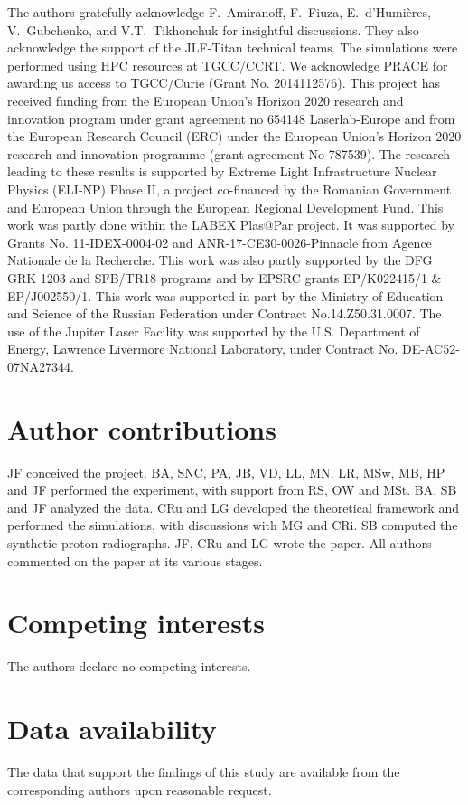 \documentclass[aps,showpacs,superscriptaddress]{revtex4}
\begin{document}
\begin{acknowledgments}
The authors gratefully acknowledge F.~Amiranoff, F.~Fiuza, E.~d'Humi\`eres, V.~Gubchenko, and V.T.~Tikhonchuk for insightful discussions.
They also acknowledge the support of the JLF-Titan technical teams.
The simulations were performed using HPC resources at TGCC/CCRT. We acknowledge PRACE for awarding us access to TGCC/Curie (Grant No. 2014112576).
This project has received funding from the European Union’s Horizon 2020 research and innovation program under grant agreement no 654148 Laserlab-Europe and from the European Research Council (ERC) under the European Union’s Horizon 2020 research and innovation programme (grant agreement No 787539).
The research leading to these results is supported by Extreme Light Infrastructure Nuclear Physics (ELI-NP) Phase II, a project co-financed by the Romanian Government and European Union through the European Regional Development Fund. This work was partly done within the LABEX Plas@Par project. It was supported by Grants No. 11-IDEX-0004-02 and ANR-17-CE30-0026-Pinnacle from Agence Nationale de la Recherche. This work was also partly supported by the DFG GRK 1203 and SFB/TR18 programs and by EPSRC grants EP/K022415/1 \& EP/J002550/1.
This work was supported in part by the Ministry of Education and Science of the Russian Federation under Contract No.14.Z50.31.0007.
The use of the Jupiter Laser Facility  was supported by the U.S. Department of Energy, Lawrence Livermore  National Laboratory, under Contract No. DE-AC52-07NA27344.
\end{acknowledgments}

\section*{Author contributions}
JF conceived the project. BA, SNC, PA, JB, VD, LL, MN, LR, MSw, MB, HP and JF performed the experiment, with support from RS, OW and MSt.  BA, SB and JF analyzed the data. CRu and LG developed the theoretical framework and performed the simulations, with discussions with MG and CRi. SB computed the synthetic proton radiographs. JF, CRu and LG wrote the paper. All authors commented on the paper at its various stages.

\section*{Competing interests}
The authors declare no competing interests. 

\section*{Data availability}
The data that support the findings of this study are available from the corresponding authors upon reasonable request. 
\end{document}
